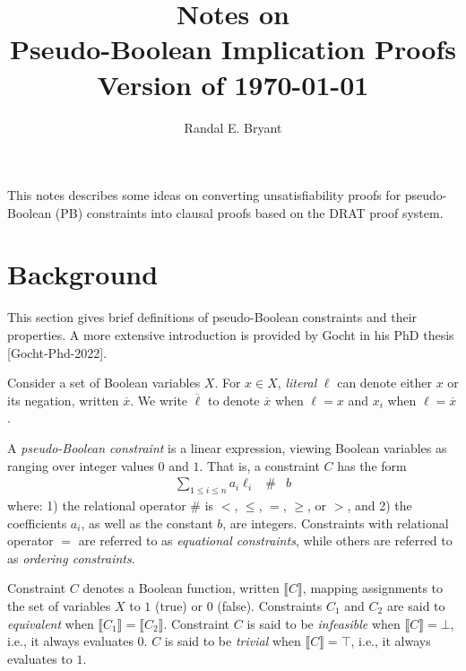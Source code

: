 \documentclass{easychair}
\title{Notes on \\ Pseudo-Boolean Implication Proofs \\ Version of \today}
\author{Randal E. Bryant}
\institute{
Computer Science Department \\
Carnegie Mellon University, Pittsburgh, PA, United States\\
\email{Randy.Bryant@cs.cmu.edu}
}
\renewcommand{\obar}[1]{\overline{#1}}
\newcommand{\lit}{\ell}
\newcommand{\func}[1]{\llbracket#1\rrbracket}
\begin{document}
\maketitle

This notes describes some ideas on converting unsatisfiability proofs
for pseudo-Boolean (PB) constraints into clausal proofs based on the
DRAT proof system.

\section{Background}

This section gives brief definitions of pseudo-Boolean constraints and their properties.
A more extensive introduction is provided by Gocht in his PhD thesis [Gocht-Phd-2022].

Consider a set of Boolean variables $X$.  For $x \in X$, {\em literal}
$\lit$ can denote either $x$ or its negation, written $\obar{x}$.  We
write $\obar{\lit}$ to denote $\obar{x}$ when $\lit = x$ and $x_i$ when
$\lit = \obar{x}$.

A {\em pseudo-Boolean constraint} is a linear expression, viewing
Boolean variables as ranging over integer values $0$ and $1$.  That
is, 
a constraint $C$ has the form
\begin{eqnarray}
\sum_{1 \leq i \leq n} a_i \lit_i & \# & b \label{eqn:pbconstraint}
\end{eqnarray}
where: 1) the relational operator $\#$ is $<$, $\leq$, $=$, $\geq$, or
$>$, and 2) the coefficients $a_i$, as well as the constant $b$, are
integers.
Constraints with relational operator $=$ are referred to as {\em equational constraints},
while others are referred to as {\em ordering constraints}.

Constraint $C$ denotes a Boolean function, written
$\func{C}$, mapping assignments to the set of variables $X$ to $1$
(true) or $0$ (false).  Constraints $C_1$ and $C_2$ are said to {\em
  equivalent} when $\func{C_1} = \func{C_2}$.
Constraint $C$ is said to be {\em infeasible} when $\func{C} = \bot$, i.e., it always evaluates $0$.
$C$ is said to be {\em trivial} when $\func{C} = \top$, i.e., it always evaluates to $1$.
\end{document}
